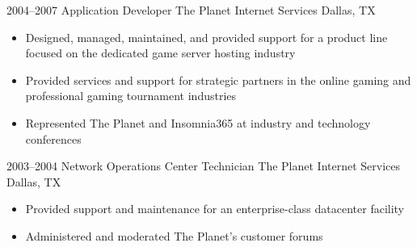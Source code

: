 \documentclass[11pt,a4paper,sans]{moderncv}
\begin{document}
    \cventry
      {2004--2007}
      {Application Developer}
      {The Planet Internet Services}
      {Dallas, TX}
      {}
      {
        \begin{itemize}
          \item Designed, managed, maintained, and provided support for a product line focused on the dedicated game server hosting industry
          \item Provided services and support for strategic partners in the online gaming and professional gaming tournament industries
          \item Represented The Planet and Insomnia365 at industry and technology conferences
        \end{itemize}
      }

    \cventry
      {2003--2004}
      {Network Operations Center Technician}
      {The Planet Internet Services}
      {Dallas, TX}
      {}
      {
        \begin{itemize}
          \item Provided support and maintenance for an enterprise-class datacenter facility
          \item Administered and moderated The Planet's customer forums
        \end{itemize}
      }

\end{document}

